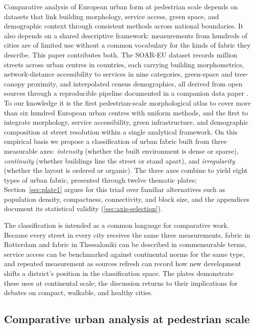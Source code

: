 \documentclass[review,authoryear]{elsarticle}
\begin{document}
Comparative analysis of European urban form at pedestrian scale depends on datasets that link building morphology, service access, green space, and demographic context through consistent methods across national boundaries. It also depends on a shared descriptive framework: measurements from hundreds of cities are of limited use without a common vocabulary for the kinds of fabric they describe. This paper contributes both. The SOAR-EU dataset records \nTotalM{} million streets across \nCities{} urban centres in \nCountries{} countries, each carrying building morphometrics, network-distance accessibility to services in nine categories, green-space and tree-canopy proximity, and interpolated census demographics, all derived from open sources through a reproducible pipeline documented in a companion data paper \citep{simons2024soar}. To our knowledge it is the first pedestrian-scale morphological atlas to cover more than six hundred European urban centres with uniform methods, and the first to integrate morphology, service accessibility, green infrastructure, and demographic composition at street resolution within a single analytical framework. On this empirical basis we propose a classification of urban fabric built from three measurable axes: \emph{intensity} (whether the built environment is dense or sparse), \emph{continuity} (whether buildings line the street or stand apart), and \emph{irregularity} (whether the layout is ordered or organic). The three axes combine to yield eight types of urban fabric, presented through twelve thematic plates; Section~\ref{sec:plate1} argues for this triad over familiar alternatives such as population density, compactness, connectivity, and block size, and the appendices document its statistical validity (\ref{sec:axis-selection}).

The classification is intended as a common language for comparative work. Because every street in every city receives the same three measurements, fabric in Rotterdam and fabric in Thessaloniki can be described in commensurable terms, service access can be benchmarked against continental norms for the same type, and repeated measurement as sources refresh can record how new development shifts a district's position in the classification space. The plates demonstrate these uses at continental scale; the discussion returns to their implications for debates on compact, walkable, and healthy cities.

\subsection{Comparative urban analysis at pedestrian scale}
\end{document}
